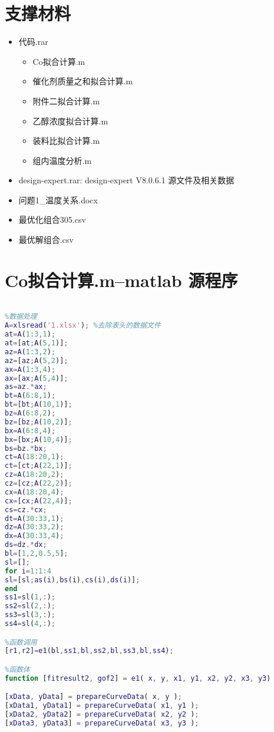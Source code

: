 \documentclass[withoutpreface,bwprint]{cumcmthesis} %
\begin{document}
\newpage
\begin{appendices}
	
\section{支撑材料}
\begin{itemize}
	\item 代码.rar
	\begin{itemize}
		\item Co拟合计算.m
		\item 催化剂质量之和拟合计算.m
		\item 附件二拟合计算.m
		\item 乙醇浓度拟合计算.m
		\item 装料比拟合计算.m
		\item 组内温度分析.m
	\end{itemize}
	\item design-expert.rar: design-expert V8.0.6.1 源文件及相关数据
	\item 问题1\_温度关系.docx
	\item 最优化组合305.csv
	\item 最优解组合.csv
\end{itemize}


\section{Co拟合计算.m--matlab 源程序}

\begin{lstlisting}[language=matlab]
%负载拟合

%数据处理
A=xlsread('1.xlsx'); %去除表头的数据文件
at=A(1:3,1);
at=[at;A(5,1)];
az=A(1:3,2);
az=[az;A(5,2)];
ax=A(1:3,4);
ax=[ax;A(5,4)];
as=az.*ax;
bt=A(6:8,1);
bt=[bt;A(10,1)];
bz=A(6:8,2);
bz=[bz;A(10,2)];
bx=A(6:8,4);
bx=[bx;A(10,4)];
bs=bz.*bx;
ct=A(18:20,1);
ct=[ct;A(22,1)];
cz=A(18:20,2);
cz=[cz;A(22,2)];
cx=A(18:20,4);
cx=[cx;A(22,4)];
cs=cz.*cx;
dt=A(30:33,1);
dz=A(30:33,2);
dx=A(30:33,4);
ds=dz.*dx;
bl=[1,2,0.5,5];
sl=[];
for i=1:1:4
sl=[sl;as(i),bs(i),cs(i),ds(i)];  
end
ss1=sl(1,:);
ss2=sl(2,:);
ss3=sl(3,:);
ss4=sl(4,:);

%函数调用
[r1,r2]=e1(bl,ss1,bl,ss2,bl,ss3,bl,ss4);

%函数体
function [fitresult2, gof2] = e1( x, y, x1, y1, x2, y2, x3, y3) 

[xData, yData] = prepareCurveData( x, y );
[xData1, yData1] = prepareCurveData( x1, y1 );
[xData2, yData2] = prepareCurveData( x2, y2 );
[xData3, yData3] = prepareCurveData( x3, y3 );


\end{lstlisting}
\end{appendices}
\end{document}
